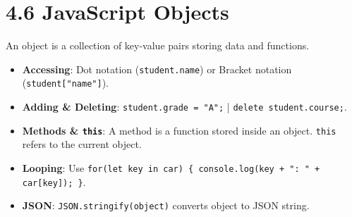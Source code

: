 \section{4.6 JavaScript Objects}
An object is a collection of key-value pairs storing data and functions.
\begin{itemize}[leftmargin=*]
    \item \textbf{Accessing}: Dot notation (\texttt{student.name}) or Bracket notation (\texttt{student["name"]}).
    \item \textbf{Adding \& Deleting}: \texttt{student.grade = "A";} | \texttt{delete student.course;}.
    \item \textbf{Methods \& \texttt{this}}: A method is a function stored inside an object. \texttt{this} refers to the current object.
    \item \textbf{Looping}: Use \texttt{for(let key in car) \{ console.log(key + ": " + car[key]); \}}.
    \item \textbf{JSON}: \texttt{JSON.stringify(object)} converts object to JSON string.
\end{itemize}
